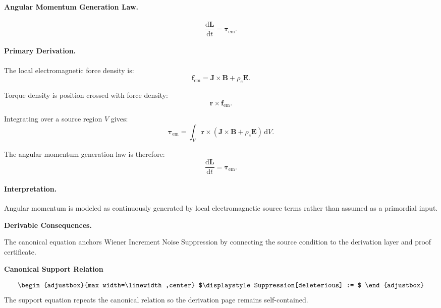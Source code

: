 \paragraph{Angular Momentum Generation Law.}
\begin{equation}
\frac{\mathrm{d}\mathbf{L}}{\mathrm{d}t}
=
\boldsymbol{\tau}_{\mathrm{em}} .
\end{equation}

\paragraph{Primary Derivation.}
The local electromagnetic force density is:
\begin{equation}
\mathbf{f}_{\mathrm{em}}
=
\mathbf{J}\times\mathbf{B}
+
\rho_e\mathbf{E}.
\end{equation}

Torque density is position crossed with force density:
\begin{equation}
\mathbf{r}\times\mathbf{f}_{\mathrm{em}}.
\end{equation}

Integrating over a source region $V$ gives:
\begin{equation}
\boldsymbol{\tau}_{\mathrm{em}}
=
\int_V
\mathbf{r}\times
\left(
\mathbf{J}\times\mathbf{B}
+
\rho_e\mathbf{E}
\right)
\,\mathrm{d}V .
\end{equation}

The angular momentum generation law is therefore:
\begin{equation}
\boxed{
\frac{\mathrm{d}\mathbf{L}}{\mathrm{d}t}
=
\boldsymbol{\tau}_{\mathrm{em}} .
}
\end{equation}

\paragraph{Interpretation.}
Angular momentum is modeled as continuously generated by local electromagnetic source terms rather than assumed as a primordial input.

\par\vspace{0.35em}
\noindent\textbf{Derivable Consequences.}\quad
\begingroup
\footnotesize
\raggedright
The canonical equation anchors Wiener Increment Noise Suppression by connecting the source condition to the derivation layer and proof certificate.
\par\endgroup

\noindent\textbf{Canonical Support Relation}\par
\[
\begin{adjustbox}{max width=\linewidth,center}
$\displaystyle
Suppression[deleterious] :=
$
\end{adjustbox}
\]
\noindent The support equation repeats the canonical relation so the derivation page remains self-contained.\par

